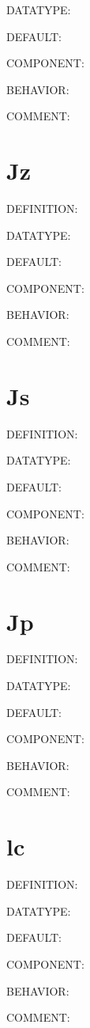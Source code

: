 {\color{green}DATATYPE:}

{\color{blue}DEFAULT:}

{\color{brown}COMPONENT:}

{\color{purple}BEHAVIOR:}

{\color{olive}COMMENT:}

\section{Jz}
{\color{red}DEFINITION:}

{\color{green}DATATYPE:}

{\color{blue}DEFAULT:}

{\color{brown}COMPONENT:}

{\color{purple}BEHAVIOR:}

{\color{olive}COMMENT:}

\section{Js}
{\color{red}DEFINITION:}

{\color{green}DATATYPE:}

{\color{blue}DEFAULT:}

{\color{brown}COMPONENT:}

{\color{purple}BEHAVIOR:}

{\color{olive}COMMENT:}

\section{Jp}
{\color{red}DEFINITION:}

{\color{green}DATATYPE:}

{\color{blue}DEFAULT:}

{\color{brown}COMPONENT:}

{\color{purple}BEHAVIOR:}

{\color{olive}COMMENT:}

\section{lc}
{\color{red}DEFINITION:}

{\color{green}DATATYPE:}

{\color{blue}DEFAULT:}

{\color{brown}COMPONENT:}

{\color{purple}BEHAVIOR:}

{\color{olive}COMMENT:}

